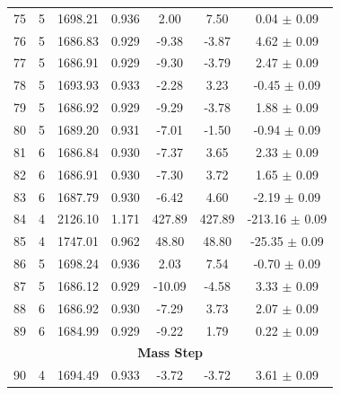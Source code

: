 \begin{longtable}{c c c c c c c}
    75 & 5 & 1698.21 & 0.936 & 2.00 & \cellcolor{aiclightred}7.50 & 0.04 $\pm$ 0.09 \\
    76 & 5 & 1686.83 & 0.929 & \cellcolor{aiclightgreen}-9.38 & \cellcolor{aiclightyellow}-3.87 & \cellcolor{aiclightgreen}4.62 $\pm$ 0.09 \\
    77 & 5 & 1686.91 & 0.929 & \cellcolor{aiclightgreen}-9.30 & \cellcolor{aiclightyellow}-3.79 & \cellcolor{aicyellow}2.47 $\pm$ 0.09 \\
    78 & 5 & 1693.93 & 0.933 & \cellcolor{aiclightyellow}-2.28 & \cellcolor{aiclightorange}3.23 & -0.45 $\pm$ 0.09 \\
    79 & 5 & 1686.92 & 0.929 & \cellcolor{aiclightgreen}-9.29 & \cellcolor{aiclightyellow}-3.78 & \cellcolor{aicyellow}1.88 $\pm$ 0.09 \\
    80 & 5 & 1689.20 & 0.931 & \cellcolor{aiclightgreen}-7.01 & -1.50 & -0.94 $\pm$ 0.09 \\
    81 & 6 & 1686.84 & 0.930 & \cellcolor{aiclightgreen}-7.37 & \cellcolor{aiclightorange}3.65 & \cellcolor{aicyellow}2.33 $\pm$ 0.09 \\
    82 & 6 & 1686.91 & 0.930 & \cellcolor{aiclightgreen}-7.30 & \cellcolor{aiclightorange}3.72 & \cellcolor{aicyellow}1.65 $\pm$ 0.09 \\
    83 & 6 & 1687.79 & 0.930 & \cellcolor{aicyellow}-6.42 & \cellcolor{aicorange}4.60 & \cellcolor{aicorange}-2.19 $\pm$ 0.09 \\
    84 & 4 & 2126.10 & 1.171 & \cellcolor{aicred}427.89 & \cellcolor{aicred}427.89 & \cellcolor{aicred}-213.16 $\pm$ 0.09 \\
    85 & 4 & 1747.01 & 0.962 & \cellcolor{aicred}48.80 & \cellcolor{aicred}48.80 & \cellcolor{aicred}-25.35 $\pm$ 0.09 \\
    86 & 5 & 1698.24 & 0.936 & \cellcolor{aiclightorange}2.03 & \cellcolor{aiclightred}7.54 & -0.70 $\pm$ 0.09 \\
    87 & 5 & 1686.12 & 0.929 & \cellcolor{aicgreen}-10.09 & \cellcolor{aicyellow}-4.58 & \cellcolor{aiclightgreen}3.33 $\pm$ 0.09 \\
    88 & 6 & 1686.92 & 0.930 & \cellcolor{aiclightgreen}-7.29 & \cellcolor{aiclightorange}3.73 & \cellcolor{aicyellow}2.07 $\pm$ 0.09 \\
    89 & 6 & 1684.99 & 0.929 & \cellcolor{aiclightgreen}-9.22 & 1.79 & 0.22 $\pm$ 0.09 \\
    \hline
    \multicolumn{7}{c}{\textbf{Mass Step}} \\
    \hline
    90 & 4 & 1694.49 & 0.933 & \cellcolor{aiclightyellow}-3.72 & \cellcolor{aiclightyellow}-3.72 & \cellcolor{aiclightgreen}3.61 $\pm$ 0.09 \\

\end{longtable}
